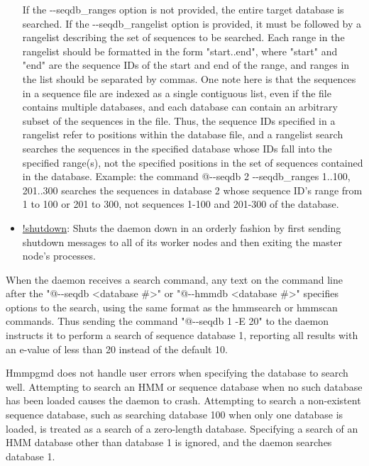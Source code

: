 \documentclass[notoc,justified]{tufte-book}    %
\begin{document}
\begin{itemize}
{  If the -{}-seqdb\_ranges option is not provided, the entire target database is searched. If the -{}-seqdb\_rangelist option is provided, it must be followed by a rangelist describing the set of sequences to be searched.  Each range in the rangelist should be formatted in the form "start..end", where "start" and "end" are the sequence IDs of the start and end of the range, and ranges in the list should be separated by commas. One note here is that the sequences in a sequence file are indexed as a single contiguous list, even if the file contains multiple databases, and each database can contain an arbitrary subset of the sequences in the file.  Thus, the sequence IDs specified in a rangelist refer to positions within the database file, and a rangelist search searches the sequences in the specified database whose IDs fall into the specified range(s), not the specified positions in the set of sequences contained in the database. Example: the command @-{}-seqdb 2 -{}-seqdb\_ranges 1..100, 201..300 searches the sequences in database 2 whose sequence ID's range from 1 to 100 or 201 to 300, not sequences 1-100 and 201-300 of the database.}
  \item{\underline{!shutdown}: Shuts the daemon down in an orderly fashion by first sending shutdown messages to all of its worker nodes and then exiting the master node's processes.}
\end{itemize}

When the daemon receives a search command, any text on the command line after the "@-{}-seqdb <database \#>" or "@-{}-hmmdb <database \#>" specifies options to the search, using the same format as the hmmsearch or hmmscan commands.  Thus sending the command "@-{}-seqdb 1 -E 20" to the daemon instructs it to perform a search of sequence database 1, reporting all results with an e-value of less than 20 instead of the default 10.

Hmmpgmd does not handle user errors when specifying the database to search well.  Attempting to search an HMM or sequence database when no such database has been loaded causes the daemon to crash.  Attempting to search a non-existent sequence database, such as searching database 100 when only one database is loaded, is treated as a search of a zero-length database.  Specifying a search of an HMM database other than database 1 is ignored, and the daemon searches database 1.
\end{document}
